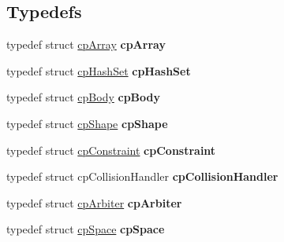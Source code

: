 \subsection*{Typedefs}
\begin{DoxyCompactItemize}
\item 
\hypertarget{group__misc_ga6b357f2c1d3fedc78e2c7aaa5186d566}{typedef struct \hyperlink{structcp_array}{cp\-Array} {\bfseries cp\-Array}}\label{group__misc_ga6b357f2c1d3fedc78e2c7aaa5186d566}

\item 
\hypertarget{group__misc_ga0c80056192ac0574141a88de933b16b3}{typedef struct \hyperlink{structcp_hash_set}{cp\-Hash\-Set} {\bfseries cp\-Hash\-Set}}\label{group__misc_ga0c80056192ac0574141a88de933b16b3}

\item 
\hypertarget{group__misc_ga89830b081a94b2500cc1ca31c43ac006}{typedef struct \hyperlink{structcp_body}{cp\-Body} {\bfseries cp\-Body}}\label{group__misc_ga89830b081a94b2500cc1ca31c43ac006}

\item 
\hypertarget{group__misc_ga16375f8bc5b219cde7560b23443b3a95}{typedef struct \hyperlink{structcp_shape}{cp\-Shape} {\bfseries cp\-Shape}}\label{group__misc_ga16375f8bc5b219cde7560b23443b3a95}

\item 
\hypertarget{group__misc_gabdb40b2f09deac0d0e05605be0701be3}{typedef struct \hyperlink{structcp_constraint}{cp\-Constraint} {\bfseries cp\-Constraint}}\label{group__misc_gabdb40b2f09deac0d0e05605be0701be3}

\item 
\hypertarget{group__misc_gad27db8fe21c73da2f139b0f28ded9818}{typedef struct cp\-Collision\-Handler {\bfseries cp\-Collision\-Handler}}\label{group__misc_gad27db8fe21c73da2f139b0f28ded9818}

\item 
\hypertarget{group__misc_ga771a9d6a062a6097f0e6bb1b2682e93f}{typedef struct \hyperlink{structcp_arbiter}{cp\-Arbiter} {\bfseries cp\-Arbiter}}\label{group__misc_ga771a9d6a062a6097f0e6bb1b2682e93f}

\item 
\hypertarget{group__misc_ga8838f85d2e2ba627fc4c9208fb1a4682}{typedef struct \hyperlink{structcp_space}{cp\-Space} {\bfseries cp\-Space}}\label{group__misc_ga8838f85d2e2ba627fc4c9208fb1a4682}

\end{DoxyCompactItemize}
